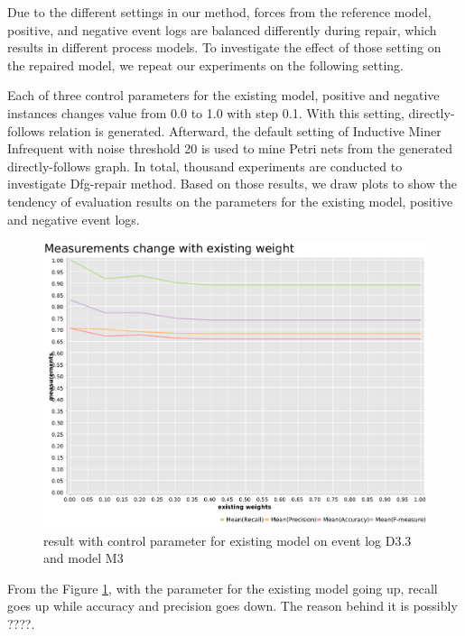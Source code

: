 Due to the different settings in our method, forces from the reference model, positive, and negative event logs are balanced differently during repair, which results in different process models. To investigate the effect of those setting on the repaired model, we repeat our experiments on the following setting. 

Each of three control parameters for the existing model, positive and negative instances changes value from 0.0 to 1.0 with step 0.1. With this setting, directly-follows relation is generated. Afterward, the default setting of Inductive Miner Infrequent with noise threshold 20 is used to mine Petri nets from the generated directly-follows graph. In total, thousand experiments are conducted to investigate Dfg-repair method. Based on those results, we draw plots to show the tendency of evaluation results on the parameters for the existing model, positive and negative event logs. 

\begin{figure}[htb]
	\includegraphics[width=\linewidth]{figures/evaluation/M3-D43-ext-weight-plot.pdf}
	\caption{result with control parameter for existing model on event log D3.3 and model M3}
	\label{fig:ext-weight}
\end{figure} 
From the Figure \ref{fig:ext-weight}, with the parameter for the existing model going up, recall goes up while accuracy and precision goes down. The reason behind it is possibly ????.


